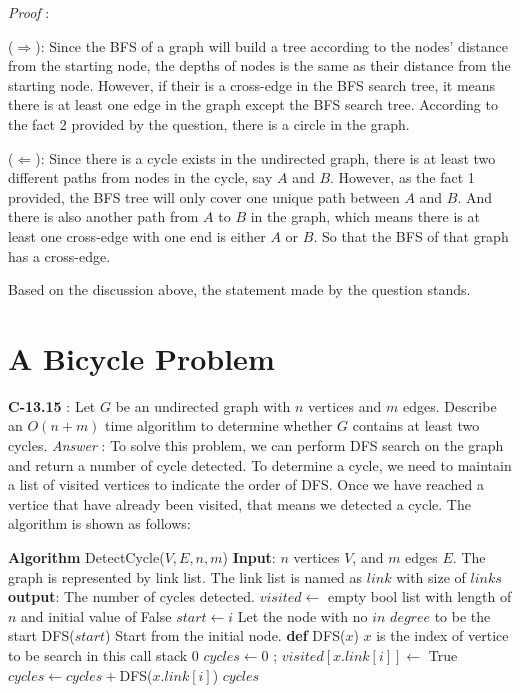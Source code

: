 \documentclass[11pt]{article}
\begin{document}
\noindent\emph{Proof} : 

($\Longrightarrow$): Since the BFS of a graph will build a tree according to the nodes' distance from the starting node, the depths of nodes is the same as their distance from the starting node. However, if their is a cross-edge in the BFS search tree, it means there is at least one edge in the graph except the BFS search tree. According to the fact 2 provided by the question, there is a circle in the graph.

($\Longleftarrow$): Since there is a cycle exists in the undirected graph, there is at least two different paths from nodes in the cycle, say $A$ and $B$. However, as the fact 1 provided, the BFS tree will only cover one unique path between $A$ and $B$. And there is also another path from $A$ to $B$ in the graph, which means there is at least one cross-edge with one end is either $A$ or $B$. So that the BFS of that graph has a cross-edge.

Based on the discussion above, the statement made by the question stands.

\section{A Bicycle Problem}
\textbf{C-13.15} : Let $G$ be an undirected graph with $n$ vertices and $m$ edges. Describe an $O(n+m)$ time algorithm to determine whether $G$ contains at least two cycles.
\noindent\emph{Answer} : To solve this problem, we can perform DFS search on the graph and return a number of cycle detected. To determine a cycle, we need to maintain a list of visited vertices to indicate the order of DFS. Once we have reached a vertice that have already been visited, that means we detected a cycle. The algorithm is shown as follows:
\begin{algorithmic}
	\State \textbf{Algorithm} DetectCycle($V,E,n,m$)
	\State \textbf{Input}: $n$ vertices $V$, and $m$ edges $E$. The graph is represented by link list. The link list is named as $link$ with size of $links$
	\State \textbf{output}: The number of cycles detected.
	\State 
	\State $visited\gets$ empty bool list with length of $n$ and initial value of False
			\State $start\gets i$ \Comment Let the node with no $in$ $degree$ to be the start
		\EndIf
	\EndFor
	\State \Return DFS($start$) \Comment Start from the initial node.
	\State 
	\State \textbf{def} DFS($x$) \Comment $x$ is the index of vertice to be search in this call stack
	\State \Return $0$
	\Else
	\State $cycles\gets0$
	\State{};
	\Else
	\State $visited[x.link[i]]\gets$ True 
	\State $cycles\gets cycles +$DFS($x.link[i]$)
	\EndIf
	\EndFor
	\State \Return $cycles$
	\EndIf
\end{algorithmic}
\end{document}

